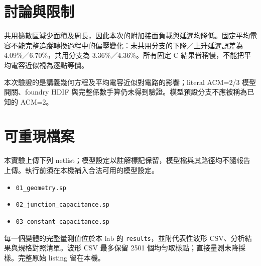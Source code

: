 \section{討論與限制}
共用擴散區減少面積及周長，因此本次的附加接面負載與延遲均降低。固定平均電容不能完整追蹤轉換過程中的偏壓變化：未共用分支的下降／上升延遲誤差為 4.09\%／6.70\%，共用分支為 3.36\%／4.36\%。所有固定 C 結果皆稍慢，不能把平均電容近似視為逐點等價。

本次驗證的是講義幾何方程及平均電容近似對電路的影響；literal ACM=2/3 模型開關、foundry HDIF 與完整係數手算仍未得到驗證。模型預設分支不應被稱為已知的 ACM=2。

\section{可重現檔案}
本實驗上傳下列 netlist；模型設定以註解標記保留，模型檔與其路徑均不隨報告上傳。執行前須在本機補入合法可用的模型設定。
\begin{itemize}
\item \texttt{01\_geometry.sp}
\item \texttt{02\_junction\_capacitance.sp}
\item \texttt{03\_constant\_capacitance.sp}
\end{itemize}
每一個變體的完整量測值位於本 lab 的 \texttt{results}，並附代表性波形 CSV、分析結果與規格對照清單。波形 CSV 最多保留 2501 個均勻取樣點；直接量測未降採樣。完整原始 listing 留在本機。

